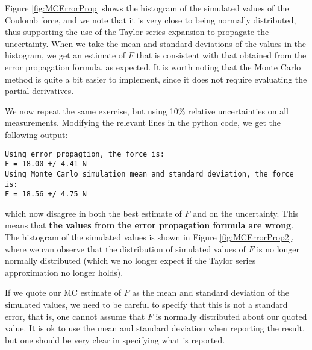 Figure \ref{fig:MCErrorProp} shows the histogram of the simulated values of the Coulomb force, and we note that it is very close to being normally distributed, thus supporting the use of the Taylor series expansion to propagate the uncertainty. When we take the mean and standard deviations of the values in the histogram, we get an estimate of $F$ that is consistent with that obtained from the error propagation formula, as expected. It is worth noting that the Monte Carlo method is quite a bit easier to implement, since it does not require evaluating the partial derivatives.

We now repeat the same exercise, but using 10\% relative uncertainties on all measurements. Modifying the relevant lines in the python code, we get the following output:
\begin{verbatim}
Using error propagtion, the force is:
F = 18.00 +/ 4.41 N
Using Monte Carlo simulation mean and standard deviation, the force is:
F = 18.56 +/ 4.75 N
\end{verbatim}
which now disagree in both the best estimate of $F$ and on the uncertainty. This means that \textbf{the values from the error propagation formula are wrong}. The histogram of the simulated values is shown in Figure \ref{fig:MCErrorProp2}, where we can observe that the distribution of simulated values of $F$ is no longer normally distributed (which we no longer expect if the Taylor series approximation no longer holds).

If we quote our MC estimate of $F$ as the mean and standard deviation of the simulated values, we need to be careful to specify that this is not a standard error, that is, one cannot assume that $F$ is normally distributed about our quoted value. It is ok to use the mean and standard deviation when reporting the result, but one should be very clear in specifying what is reported.

